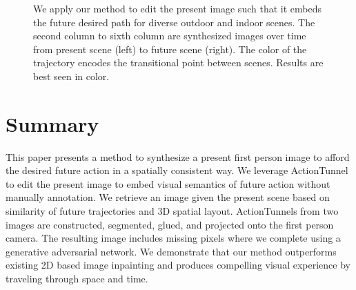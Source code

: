 \documentclass[10pt,twocolumn,letterpaper]{article}
\begin{document}


\begin{figure*}[th]
  \centering  
      \vspace{-2mm}
      \vspace{-2mm}
      \vspace{-2mm}
      \vspace{-2mm}
      \vspace{-2mm}
      \vspace{-2mm}
  \caption{We apply our method to edit the present image such that it embeds the future desired path for diverse outdoor and indoor scenes. The second column to sixth column are synthesized images over time from present scene (left) to future scene (right). The color of the trajectory encodes the transitional point between scenes. Results are best seen in color.} 
  \label{Fig:qual}
\end{figure*}

\section{Summary}
This paper presents a method to synthesize a present first person image to afford the desired future action in a spatially consistent way. We leverage ActionTunnel to edit the present image to embed visual semantics of future action without manually annotation. We retrieve an image given the present scene based on similarity of future trajectories and 3D spatial layout. ActionTunnels from two images are constructed, segmented, glued, and projected onto the first person camera. The resulting image includes missing pixels where we complete using a generative adversarial network. We demonstrate that our method outperforms existing 2D based image inpainting and produces compelling visual experience by traveling through space and time.




\newpage
{\footnotesize


}
\end{document}
